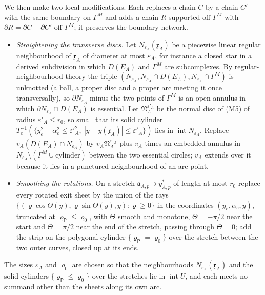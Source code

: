 We then make two local modifications. Each replaces a chain $C$ by a chain $C'$ with the same
boundary on $\Gamma^M$ and adds a chain $R$ supported off $\Gamma^M$ with $\partial R=\partial C-\partial C'$ off $\Gamma^M$;
it preserves the boundary network.
\begin{itemize}
\item \emph{Straightening the transverse discs.} Let $N_{\varepsilon_A}(\mathfrak x_A)$ be a piecewise linear regular
neighbourhood of $\mathfrak x_A$ of diameter at most $\varepsilon_A$, for instance a closed star in a derived subdivision in
which $\bar D(E_A)$ and $\Gamma^M$ are subcomplexes. By regular-neighbourhood theory \cite[Ch.~3]{RS} the triple
$(N_{\varepsilon_A},N_{\varepsilon_A}\cap\bar D(E_A),N_{\varepsilon_A}\cap\Gamma^M)$ is unknotted (a ball, a proper disc and a
proper arc meeting it once transversally), so $\partial N_{\varepsilon_A}$ minus the two points of $\Gamma^M$ is an open
annulus in which $\partial N_{\varepsilon_A}\cap\bar D(E_A)$ is essential. Let $\mathfrak N_A^{\varepsilon'_A}$ be the normal
disc of (M5) of radius $\varepsilon'_A\le r_0$, so small that its solid cylinder $T_e^{-1}(\{y_e^2+\alpha_e^2\le
\varepsilon'^2_A,\ |y-y(\mathfrak x_A)|\le\varepsilon'_A\})$ lies in $\operatorname{int}N_{\varepsilon_A}$. Replace
$v_A(\bar D(E_A)\cap N_{\varepsilon_A})$ by $v_A\mathfrak N^{\varepsilon'_A}_A$ plus $v_A$ times an embedded annulus in
$N_{\varepsilon_A}\setminus(\Gamma^M\cup\text{cylinder})$ between the two essential circles; $v_A$ extends over it because it
lies in a punctured neighbourhood of an arc point.
\item \emph{Smoothing the rotations.} On a stretch $\mathfrak a_{A,p}\ni y^*_{A,p}$ of length at most $r_0$ replace every
rotated exit sheet by the union of the rays $\{(\varrho\cos\Theta(y),\varrho\sin\Theta(y),y):\varrho\ge0\}$ in the
coordinates $(y_e,\alpha_e,y)$, truncated at $\varrho_{\mathsf P}\le\varrho_0$, with $\Theta$ smooth and monotone,
$\Theta=-\pi/2$ near the start and $\Theta=\pi/2$ near the end of the stretch, passing through $\Theta=0$; add the strip on
the polygonal cylinder $\{\varrho_{\mathsf P}=\varrho_0\}$ over the stretch between the two outer curves, closed up at its
ends.
\end{itemize}
The sizes $\varepsilon_A$ and $\varrho_0$ are chosen so that the neighbourhoods $N_{\varepsilon_A}(\mathfrak x_A)$ and the
solid cylinders $\{\varrho_{\mathsf P}\le\varrho_0\}$ over the stretches lie in $\operatorname{int}U$, and each meets no
summand other than the sheets along its own arc.

